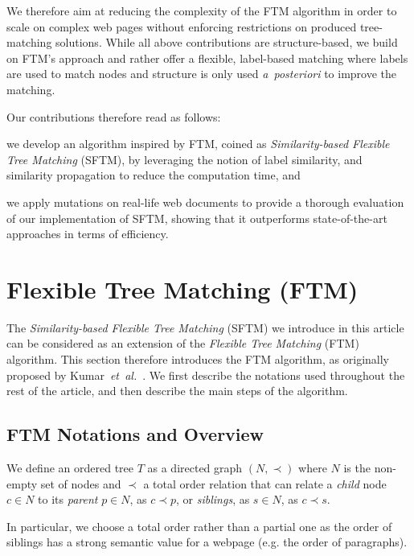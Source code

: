 We therefore aim at reducing the complexity of the FTM algorithm in order to scale on complex web pages without enforcing restrictions on produced tree-matching solutions.
While all above contributions are structure-based, we build on FTM's approach and rather offer a flexible, label-based matching where labels are used to match nodes and structure is only used \emph{a~posteriori} to improve the matching.

Our contributions therefore read as follows:
\begin{compactenum}
    \item we develop an algorithm inspired by FTM, coined as \emph{Similarity-based Flexible Tree Matching} (SFTM), by leveraging the notion of label similarity, and similarity propagation to reduce the computation time, and
    \item we apply mutations on real-life web documents to provide a thorough evaluation of our implementation of SFTM, showing that it outperforms state-of-the-art approaches in terms of efficiency.
\end{compactenum}

\section{Flexible Tree Matching (FTM)}\label{sec:ftm}
The \emph{Similarity-based Flexible Tree Matching} (SFTM) we introduce in this article can be considered as an extension of the \textit{Flexible Tree Matching} (FTM) algorithm.
This section therefore introduces the FTM algorithm, as originally proposed by Kumar~\emph{et~al.}~\cite{Kumar2011_Bricolage}.
We first describe the notations used throughout the rest of the article, and then describe the main steps of the algorithm.

\subsection{FTM Notations and Overview}
We define an ordered tree $T$ as a directed graph $(N,\prec)$ where $N$ is the non-empty set of nodes and $\prec$ a total order relation that can relate a \emph{child} node $c \in N$ to its \emph{parent} $p \in N$, as $c \prec p$, or \emph{siblings}, as $s \in N$, as $c \prec s$.

In particular, we choose a total order rather than a partial one as the order of siblings has a strong semantic value for a webpage (e.g. the order of paragraphs).

